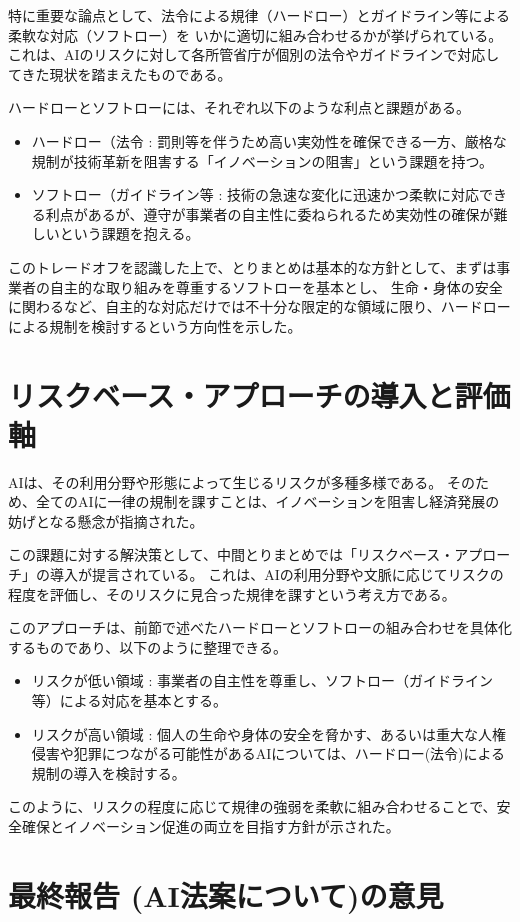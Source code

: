 特に重要な論点として、法令による規律（ハードロー）とガイドライン等による柔軟な対応（ソフトロー）を
いかに適切に組み合わせるかが挙げられている。
これは、AIのリスクに対して各所管省庁が個別の法令やガイドラインで対応してきた現状を踏まえたものである。

ハードローとソフトローには、それぞれ以下のような利点と課題がある。

\begin{itemize}
    \item ハードロー（法令 : 罰則等を伴うため高い実効性を確保できる一方、厳格な規制が技術革新を阻害する「イノベーションの阻害」という課題を持つ。
    \item ソフトロー（ガイドライン等 : 技術の急速な変化に迅速かつ柔軟に対応できる利点があるが、遵守が事業者の自主性に委ねられるため実効性の確保が難しいという課題を抱える。
\end{itemize}

このトレードオフを認識した上で、とりまとめは基本的な方針として、まずは事業者の自主的な取り組みを尊重するソフトローを基本とし、
生命・身体の安全に関わるなど、自主的な対応だけでは不十分な限定的な領域に限り、ハードローによる規制を検討するという方向性を示した。


\section{リスクベース・アプローチの導入と評価軸}
AIは、その利用分野や形態によって生じるリスクが多種多様である。
そのため、全てのAIに一律の規制を課すことは、イノベーションを阻害し経済発展の妨げとなる懸念が指摘された。

この課題に対する解決策として、中間とりまとめでは「リスクベース・アプローチ」の導入が提言されている。
これは、AIの利用分野や文脈に応じてリスクの程度を評価し、そのリスクに見合った規律を課すという考え方である。

このアプローチは、前節で述べたハードローとソフトローの組み合わせを具体化するものであり、以下のように整理できる。

\begin{itemize}
    \item リスクが低い領域 : 事業者の自主性を尊重し、ソフトロー（ガイドライン等）による対応を基本とする。
    \item リスクが高い領域 : 個人の生命や身体の安全を脅かす、あるいは重大な人権侵害や犯罪につながる可能性があるAIについては、ハードロー(法令)による規制の導入を検討する。
\end{itemize}

このように、リスクの程度に応じて規律の強弱を柔軟に組み合わせることで、安全確保とイノベーション促進の両立を目指す方針が示された。

\section{最終報告 (AI法案について)の意見}